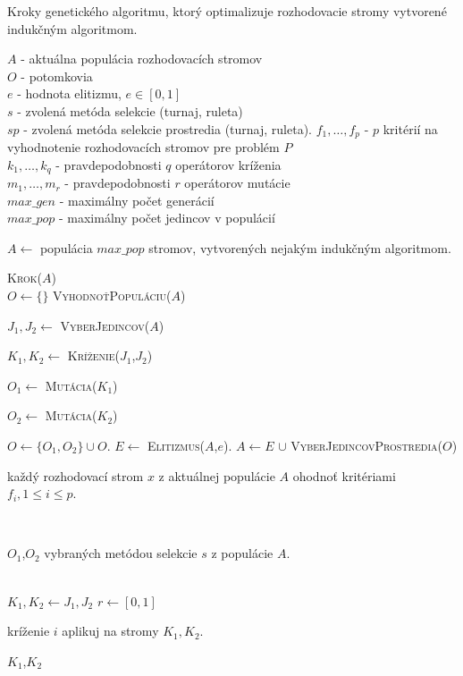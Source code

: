 \begin{algorithm}
\caption{Kroky genetického algoritmu, ktorý optimalizuje rozhodovacie stromy vytvorené indukčným algoritmom.}\label{fig:DTGeneticAlgo}
$A$ - aktuálna populácia rozhodovacích stromov \\
$O$ - potomkovia \\
$e$ - hodnota elitizmu, $e \in [0,1]$ \\
$s$ - zvolená metóda selekcie (turnaj, ruleta) \\
$sp$ - zvolená metóda selekcie prostredia (turnaj, ruleta).
$f_1,\ldots,f_p$ - $p$ kritérií na vyhodnotenie rozhodovacích stromov pre problém $P$\\
$k_{1},\ldots,k_{q}$ - pravdepodobnosti $q$ operátorov kríženia\\
$m_{1},\ldots,m_{r}$ - pravdepodobnosti $r$ operátorov mutácie\\
$max\_gen$ - maximálny počet generácií \\
$max\_pop$ - maximálny počet jedincov v populácií \\
\bigskip
\begin{algorithmic}[1]
\State \parbox[t]{375pt}{$A \gets $ populácia $max\_pop$ stromov, vytvorených nejakým indukčným algoritmom.}
	\State \textsc{Krok($A$)}
\EndFor
\\
	\State $O \gets \{\}$
	\State \textsc{VyhodnoťPopuláciu($A$)}
		\State \parbox[t]{350pt}{$J_1,J_2 \gets $ \textsc{VyberJedincov($A$)}}
		\State \parbox[t]{350pt}{$K_1,K_2 \gets $ \textsc{Kríženie($J_1$,$J_2$)}}
		\State \parbox[t]{350pt}{$O_1 \gets $ \textsc{Mutácia($K_1$)}}
		\State \parbox[t]{350pt}{$O_2 \gets $ \textsc{Mutácia($K_2$)}}		
		\State $O \gets \{O_1,O_2\} \cup O$.
	\EndWhile
	\State $E \gets$ \textsc{Elitizmus($A$,$e$)}.
	\State $A \gets  E$ $\cup$ \textsc{VyberJedincovProstredia($O$)} 
\EndProcedure
\\
\State \parbox[t]{350pt}{každý rozhodovací strom $x$ z aktuálnej populácie $A$ ohodnoť kritériami $f_i, 1 \leq i \leq p$.}
\EndProcedure
\\
\State \Return \parbox[t]{300pt}{$O_1$,$O_2$ vybraných metódou selekcie $s$ z populácie $A$.}
\EndFunction
\\
\State $K_1, K_2 \gets J_1, J_2$
\State $r \gets [0,1]$
	\State \parbox[t]{300pt}{kríženie $i$ aplikuj na stromy $K_1, K_2$.}
\EndIf
\State \Return $K_1$,$K_2$
\EndFor 
\EndFunction
{}
\end{algorithmic}
\end{algorithm}

